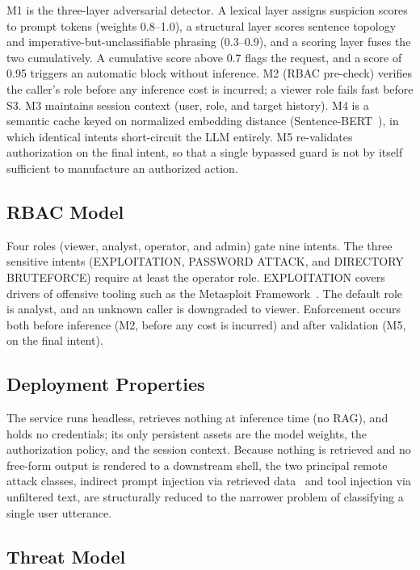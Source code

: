 \documentclass[a4paper,twoside]{article}
\begin{document}
\noindent M1 is the three-layer adversarial detector. A lexical layer assigns suspicion scores to prompt tokens (weights 0.8--1.0), a structural layer scores sentence topology and imperative-but-unclassifiable phrasing (0.3--0.9), and a scoring layer fuses the two cumulatively. A cumulative score above 0.7 flags the request, and a score of 0.95 triggers an automatic block without inference. M2 (RBAC pre-check) verifies the caller's role before any inference cost is incurred; a viewer role fails fast before S3. M3 maintains session context (user, role, and target history). M4 is a semantic cache keyed on normalized embedding distance (Sentence-BERT~\cite{Reimers19}), in which identical intents short-circuit the LLM entirely. M5 re-validates authorization on the final intent, so that a single bypassed guard is not by itself sufficient to manufacture an authorized action.

\subsection{RBAC Model}

\noindent Four roles (viewer, analyst, operator, and admin) gate nine intents. The three sensitive intents (EXPLOITATION, PASSWORD ATTACK, and DIRECTORY BRUTEFORCE) require at least the operator role. EXPLOITATION covers drivers of offensive tooling such as the Metasploit Framework~\cite{Rapid7}. The default role is analyst, and an unknown caller is downgraded to viewer. Enforcement occurs both before inference (M2, before any cost is incurred) and after validation (M5, on the final intent).

\subsection{Deployment Properties}

\noindent The service runs headless, retrieves nothing at inference time (no RAG), and holds no credentials; its only persistent assets are the model weights, the authorization policy, and the session context. Because nothing is retrieved and no free-form output is rendered to a downstream shell, the two principal remote attack classes, indirect prompt injection via retrieved data~\cite{Greshake23} and tool injection via unfiltered text, are structurally reduced to the narrower problem of classifying a single user utterance.

\subsection{Threat Model}
\end{document}
